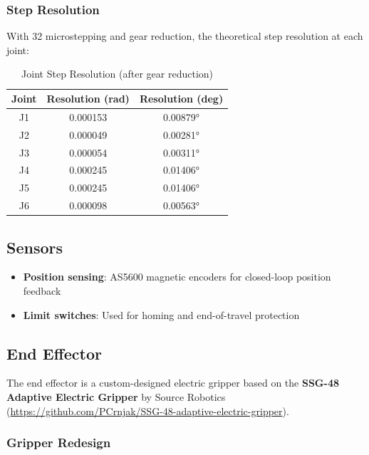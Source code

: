 \documentclass[12pt,a4paper]{report}
\begin{document}
\subsubsection{Step Resolution}

With 32 microstepping and gear reduction, the theoretical step resolution at each joint:

\begin{table}[H]
    \centering
    \begin{tabular}{|c|c|c|}
        \hline
        \textbf{Joint} & \textbf{Resolution (rad)} & \textbf{Resolution (deg)} \\
        \hline
        J1 & 0.000153 & 0.00879° \\
        J2 & 0.000049 & 0.00281° \\
        J3 & 0.000054 & 0.00311° \\
        J4 & 0.000245 & 0.01406° \\
        J5 & 0.000245 & 0.01406° \\
        J6 & 0.000098 & 0.00563° \\
        \hline
    \end{tabular}
    \caption{Joint Step Resolution (after gear reduction)}
    \label{tab:step_resolution}
\end{table}

\subsection{Sensors}

\begin{itemize}
    \item \textbf{Position sensing}: AS5600 magnetic encoders for closed-loop position feedback
    \item \textbf{Limit switches}: Used for homing and end-of-travel protection
\end{itemize}

\subsection{End Effector}

The end effector is a custom-designed electric gripper based on the \textbf{SSG-48 Adaptive Electric Gripper} by Source Robotics (\url{https://github.com/PCrnjak/SSG-48-adaptive-electric-gripper}).

\subsubsection{Gripper Redesign}
\end{document}
